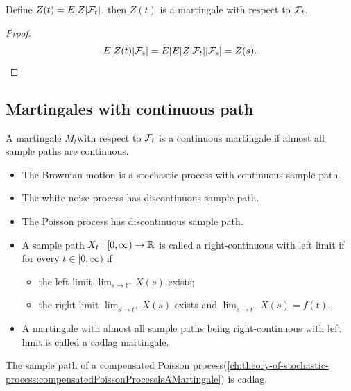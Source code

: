 \begin{refsection}
\begin{theorem}
Define $Z(t) = E[Z|\mathcal{F}_t]$, then 
$Z(t)$ is a martingale with respect to $\mathcal{F}_t$. 
\end{theorem}
\begin{proof}
	$$E[Z(t)|\mathcal{F}_s] = E[E[Z|\mathcal{F}_t]|\mathcal{F}_s] = Z(s).$$
\end{proof}





\subsection{Martingales with continuous path}
\begin{definition}
	A martingale $M_t $with respect to $\mathcal{F}_t$ is a continuous martingale if almost all sample paths are continuous. 	
\end{definition}

\begin{example}\hfill
	\begin{itemize}
		\item The Brownian motion is a stochastic process with continuous sample path.
		\item The white noise process has discontinuous sample path. 
		\item The Poisson process has discontinuous sample path.
	\end{itemize}
\end{example}

\begin{definition}\hfill
	\begin{itemize}
		\item A sample path $X_t: [0,\infty) \to \mathbb{R}$ is called a right-continuous with left limit if for every $t\in [0,\infty)$ if
		\begin{itemize}
			\item the left limit $\lim_{s\to t^-} X(s)$ exists;
			\item the right limit $\lim_{s\to t^+ }X(s)$ exists and $\lim_{s\to t^+ }X(s) = f(t)$.
		\end{itemize}
		\item A martingale with almost all sample paths being right-continuous with left limit is called a cadlag martingale.
	\end{itemize}
\end{definition}

\begin{example}
	The sample path of a compensated Poisson process(\autoref{ch:theory-of-stochastic-process:compensatedPoissonProcessIsAMartingale}) is cadlag.	
\end{example}



\end{refsection}
